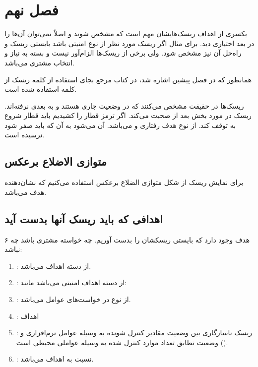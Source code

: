 \newpage

\section{فصل نهم}

یکسری از اهداف ریسک‌هایشان مهم است که مشخص شوند و اصلاً نمی‌توان آن‌ها را در بعد
اختیاری دید. برای مثال اگر ریسک مورد نظر از نوع امنیتی باشد بایستی ریسک و راه‌حل
آن نیز مشخص شود. ولی برخی از ریسک‌ها الزام‌آور نیست و بسته به نیاز و انتخاب
مشتری می‌باشد.

همانطور که در فصل پیشین اشاره شد، در کتاب مرجع بجای استفاده از کلمه ریسک از کلمه
 استفاده شده است.

ریسک‌ها در حقیقت مشخص می‌کنند که در وضعیت جاری هستند و به  بعدی
نرفته‌اند. ریسک در مورد بخش بعد از  صحبت می‌کند. اگر ترمز قطار را
کشیدیم باید قطار شروع به توقف کند. از نوع هدف رفتاری و  می‌باشد.
 آن می‌شود به آن  که باید صفر شود نرسیده است.

\subsection{متوازی الاضلاع برعکس}

برای نمایش ریسک از شکل متوازی الضلاع برعکس استفاده می‌کنیم که نشان‌دهنده
 هدف می‌باشد.

\subsection{اهدافی که باید ریسک آنها بدست آید}

۶ هدف وجود دارد که بایستی ریسکشان را بدست آوریم. چه خواسته مشتری باشد چه نباشد:

\begin{enumerate}
    \item {}: از دسته اهداف  می‌باشد.
    \item {}: از دسته اهداف امنیتی می‌باشد مانند: 
    \item {}: از نوع در خواست‌های عوامل 
    می‌باشد.
    \item {}: اهداف 
    \item {}: ریسک ناسازگاری بین وضعیت مقادیر کنترل شونده به وسیله
    عوامل نرم‌افزاری و وضعیت تطابق تعداد موارد کنترل شده به وسیله عواملی محیطی
    است ().
    \item {}: نسبت به اهداف  می‌باشد.
\end{enumerate}

